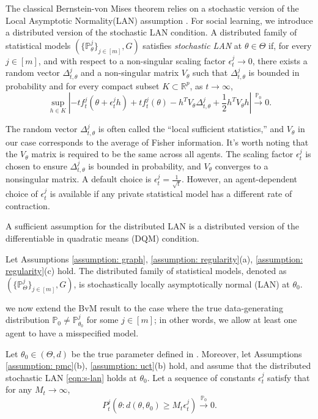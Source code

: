 \documentclass[twoside,11pt]{article}
\numberwithin{equation}{section}
\newcommand{\R}{{\mathbb{R}}}
\newcommand\bP{\mathbb{P}}
\newcommand{\pto}{\stackrel{\bP_0}{\to}}
\begin{document}
{The classical Bernstein-von Mises theorem relies on a stochastic version of the Local Asymptotic Normality(LAN) assumption \citep{VanderVaart2000}. For social learning, we introduce a distributed version of the stochastic LAN condition. A distributed family of statistical models $\left(\{\bP_\theta^j\}_{j \in [m]}, G \right)$ satisfies \textit{stochastic LAN}  at $\theta \in \Theta$ if, for every $j \in [m]$, and with respect to a non-singular scaling factor $\epsilon_t^j \to 0$, there exists a random vector $\Delta_{t, \theta}^j$ and a non-singular matrix $V_\theta$ such that $\Delta_{t, \theta}^j$ is bounded in probability and for every compact subset $K \subset \R^p$, as $t \to \infty$, 
\begin{equation} \label{eqn:s-lan}
   \sup_{h \in K} \left| - t f_t^j(\theta + \epsilon_t^j h) + t f_t^j(\theta)  -h^T V_\theta \Delta_{t, \theta}^j   + \frac{1}{2} h^T V_\theta h \right| \pto 0. 
\end{equation}

The random vector $\Delta_{t, \theta}^j$ is often called the ``local sufficient statistics,'' and $V_\theta$ in our case corresponds to the average of Fisher information. It's worth noting that the $V_\theta$ matrix is required to be the same across all agents. The scaling factor $\epsilon_t^j$ is chosen to ensure $\Delta_{t, \theta}^j$ is bounded in probability, and $V_\theta$ converges to a nonsingular matrix. A default choice is $\epsilon_t^j = \frac{1}{\sqrt{t}}$. However, an agent-dependent choice of $\epsilon_t^j$ is available if any private statistical model has a different rate of contraction. 

A sufficient assumption for the distributed LAN is a distributed version of the differentiable in quadratic means (DQM) condition. 
\begin{lemma}
\label{lemma:sc-LAN}
Let Assumptions \ref{assumption: graph}, \ref{assumption: regularity}(a), \ref{assumption: regularity}(c) hold. The distributed family of statistical models, denoted as $\left(\{\bP_\Theta^j\}_{j \in [m]}, G \right)$, is stochastically locally asymptotically normal (LAN) at $\theta_0$.
\end{lemma}
we now extend the BvM result to the case where the true data-generating distribution $\bP_0 \neq \bP_{\theta_0}^j$ for some $j \in [m]$; in other words, we allow at least one agent to have a misspecified model. 
\begin{theorem} \label{thm: bvm2}
Let $\theta_0 \in (\Theta, d)$ be the true parameter defined in . Moreover, let Assumptions \ref{assumption: pmc}(b), \ref{assumption: uct}(b) hold, and assume that the distributed stochastic LAN \eqref{eqn:s-lan} holds at $\theta_0$. Let a sequence of constants $\epsilon_t^j$ satisfy that for any $M_t \to \infty$, 
\begin{equation} \label{assumption:bvm2}
    P_t^j\left(\theta: d(\theta, \theta_0) \geq M_t \epsilon_t^j \right) \pto 0. 
\end{equation}


\end{theorem}}
\end{document}
